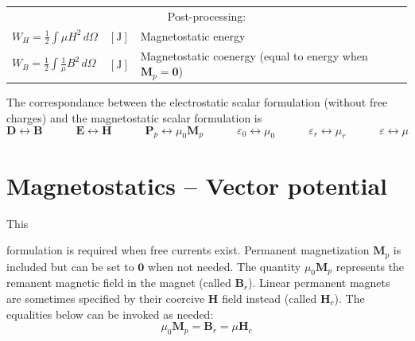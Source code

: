 \documentclass[letterpaper]{article}
\newcommand{\vect}[1]{\mathbf#1}
\begin{document}
\begin{table}[h!]
\begin{tabular}{lll}
\hline
\multicolumn{3}{c}{Post-processing:} \\
$W_H=\frac{1}{2}\!\int\mu H^2\,d\Omega$ & $[\text{J}]$ & Magnetostatic energy\\[1pt]
$W_B=\frac{1}{2}\!\int\frac{1}{\mu} B^2\,d\Omega$ & $[\text{J}]$ & Magnetostatic coenergy (equal to energy when $\vect{M}_{p}=\vect{0}$)\\[1pt]


 
\hline
\end{tabular}
\end{table}

The correspondance between the electrostatic scalar formulation (without free charges) and the magnetostatic scalar formulation is  
\begin{equation}
\vect{D}\leftrightarrow\vect{B}\qquad\quad
\vect{E}\leftrightarrow\vect{H}\qquad\quad
\vect{P}_{\!p}\leftrightarrow\mu_0\vect{M}_{p}\qquad\quad
\varepsilon_0\leftrightarrow\mu_0\qquad\quad
\varepsilon_r\leftrightarrow\mu_r\qquad\quad
\varepsilon\leftrightarrow\mu
\end{equation}





\clearpage
\section{Magnetostatics -- Vector potential}
\label{sec_mvp}

\hypertarget{sec_mvp}{This} formulation is required when free currents exist. Permanent magnetization $\vect{M}_p$ is included but can be set to $\vect{0}$ when not needed. 
The quantity $\mu_0\vect{M}_{p}$ represents the remanent magnetic field in the magnet (called $\vect{B}_r$). Linear permanent magnets are sometimes specified by their coercive $\vect{H}$ field instead (called $\vect{H}_c$). The equalities below can be invoked as needed:
\begin{equation}
\label{eqMBrHc2}
\mu_0\vect{M}_{p}=\vect{B}_r=\mu\vect{H}_c
\end{equation}
\end{document}
